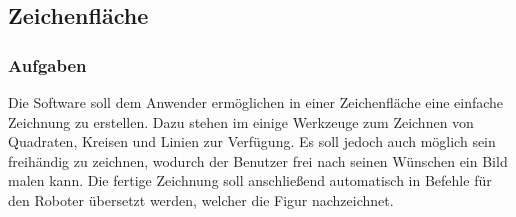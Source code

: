 
\subsection{Zeichenfläche}

\subsubsection{Aufgaben}
Die Software soll dem Anwender ermöglichen in einer Zeichenfläche eine einfache Zeichnung zu erstellen. Dazu stehen im einige Werkzeuge zum Zeichnen von Quadraten, Kreisen und Linien zur Verfügung. Es soll jedoch auch möglich sein freihändig zu zeichnen, wodurch der Benutzer frei nach seinen Wünschen ein Bild malen kann. Die fertige Zeichnung soll anschließend automatisch in Befehle für den Roboter übersetzt werden, welcher die Figur nachzeichnet.

